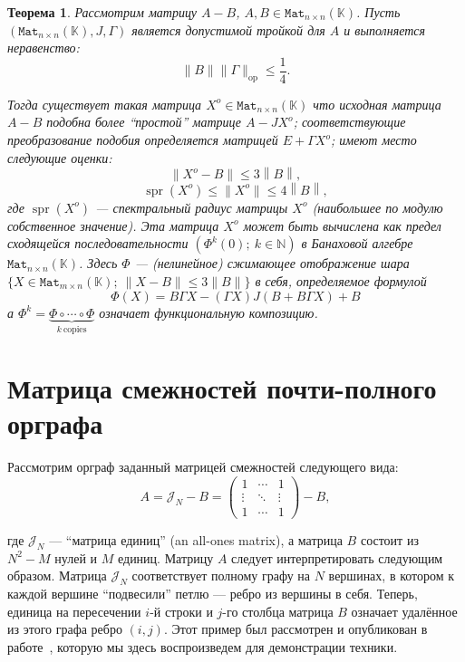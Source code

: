 \documentclass[14pt,a4paper]{extarticle}
\numberwithin{equation}{section}
\newtheorem{thm}{Теорема}
\theoremstyle{definition}
\begin{document}
\begin{thm}
    Рассмотрим матрицу \( A - B \),
         \( A, B \in \mathtt{Mat}_{n{\times}n}(\mathbb{K}) \).
    Пусть \( (\mathtt{Mat}_{n{\times}n}(\mathbb{K}), J, \Gamma) \)
        является допустимой тройкой для \( A \)
        и выполняется неравенство:
        \[
            \|B\|\|\Gamma\|_{\mathrm{op}} \leq \frac14.
        \]

    Тогда существует такая матрица \( X^o\in\mathtt{Mat}_{n{\times}n}(\mathbb{K}) \)
        что исходная матрица \( A - B \) подобна более ``простой'' матрице \( A
        - J X^o \);
        соответ\-ствующие преобразование подобия определяется матрицей \( E +
        \Gamma X^o \);
        имеют место следующие оценки:
        \[
            \|X^o - B\| \leq 3 \left\|B\right\|,
        \]
        \[
            \operatorname{spr}(X^o) \leq \|X^o\| \leq 4 \left\|B\right\|,
        \]
        где \( \operatorname{spr}(X^o) \)
        --- спектральный радиус матрицы \( X^o \) (наибольшее по модулю
        собственное значение).
    Эта матрица \( X^o \) может быть вычислена как предел сходящейся последовательности
        \( \left( \Phi^k(0);\ k\in\mathbb{N} \right) \)
        в Банаховой алгебре \( \mathtt{Mat}_{n{\times}n}(\mathbb{K}) \).
        Здесь \( \Phi \) --- (нелинейное) сжимающее отображение
        шара \( \{X\in\mathtt{Mat}_{m{\times}n}(\mathbb{K});\ \|X-B\|\leq 3\|B\| \} \)
        в себя, определяемое формулой
    \[
        \Phi(X) = B\Gamma X - (\Gamma X)J(B + B\Gamma X) + B
    \]
        а \( \Phi^k = \underbrace{\Phi\circ\cdots\circ\Phi}_{k\ \text{copies}} \)
        означает функциональную композицию.
\end{thm}

\newpage

\section{Матрица смеж\-ностей
  почти-полного ор\-графа}
Рассмотрим орграф заданный матрицей смежностей следующего вида:
\[
    A = \mathcal{J}_N - B = \begin{pmatrix}1 & \cdots & 1 \\ \vdots & \ddots & \vdots \\ 1 & \cdots & 1\end{pmatrix} - B,
\]

где \( \mathcal{J}_N \) --- ``матрица единиц'' (an all-ones matrix),
а матрица \( B \) состоит из \( N^2 - M \) нулей и \( M \) единиц.
Матрицу \( A \) следует интерпретировать следующим образом.
Матрица \( \mathcal{J}_N \) соответствует полному графу на \( N \) вершинах, в
котором к каждой вершине ``подвесили'' петлю --- ребро из вершины в себя.
Теперь, единица на пересечении
\( i \)-й строки и \( j \)-го столбца матрица \( B \)
означает удалённое из этого графа ребро \( (i, j) \).
Этот пример был рассмотрен и опубликован в работе~\cite{sergekozlukov@volgograd},
которую мы здесь воспроизведем для демонстрации техники.
\end{document}
